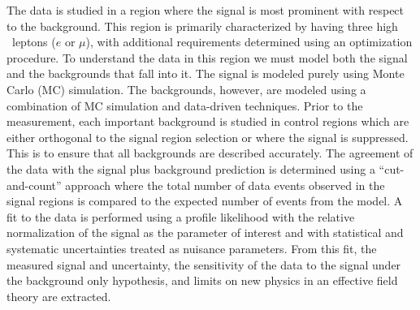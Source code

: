 The data is studied in a region where the signal is most prominent
with respect to the background.  This region is primarily characterized
by having three high \pt~leptons ($e$ or $\mu$), with additional
requirements determined using an optimization procedure.
To understand the data in this region we must model 
both the signal and the backgrounds that fall into it.
The signal is modeled purely using Monte Carlo (MC) simulation.
The backgrounds, however, are modeled using a combination of MC
simulation and data-driven techniques.
Prior to the measurement, each important background is 
studied in control regions
which are either orthogonal to the signal region selection
or where the signal is suppressed.  This is to ensure that all
backgrounds are described accurately. The agreement of the data 
with the signal plus background prediction is determined using 
a ``cut-and-count'' approach where the total number of data 
events observed in the signal regions is compared to the expected number
of events from the model.
A fit to the data is performed using a profile likelihood
with the relative normalization of the signal as 
the parameter of interest and with statistical and systematic 
uncertainties treated as nuisance parameters.
From this fit, the measured signal \xsec and uncertainty,
the sensitivity of the data to the signal 
under the background only hypothesis,
and limits on new physics in an effective field theory 
are extracted.



                                                                                


